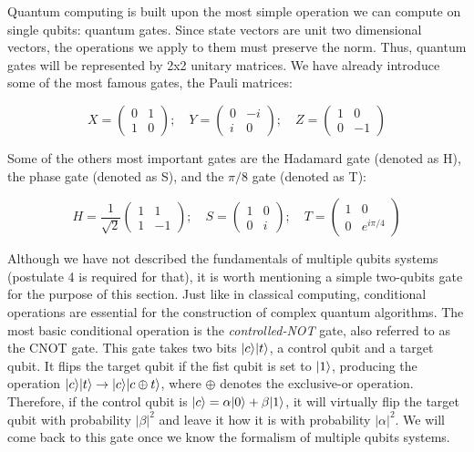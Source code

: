 Quantum computing is built upon the most simple operation we can compute on single qubits: quantum gates. Since state vectors are unit two dimensional vectors, the operations we apply to them must preserve the norm. Thus, quantum gates will be represented by 2x2 unitary matrices. We have already introduce some of the most famous gates, the Pauli matrices:

$$ X =
\begin{pmatrix}
	0 & 1 \\
	1 & 0 
\end{pmatrix}; \quad
Y =
\begin{pmatrix}
	0 & -i \\
	i & 0 
\end{pmatrix}; \quad
Z =
\begin{pmatrix}
	1 & 0 \\
	0 & -1 
\end{pmatrix}
$$

Some of the others most important gates are the Hadamard gate (denoted as H), the phase gate (denoted as S), and the $\pi/8$ gate (denoted as T):

$$ H = \frac{1}{\sqrt 2}
\begin{pmatrix}
	1 & 1 \\
	1 & -1 
\end{pmatrix}; \quad
S =
\begin{pmatrix}
	1 & 0 \\
	0 & i 
\end{pmatrix}; \quad
T =
\begin{pmatrix}
	1 & 0 \\
	0 & e^{i\pi/4} 
\end{pmatrix}
$$

Although we have not described the fundamentals of multiple qubits systems (postulate 4 is required for that), it is worth mentioning a simple two-qubits gate for the purpose of this section. Just like in classical computing, conditional operations are essential for the construction of complex quantum algorithms. The most basic conditional operation is the \emph{controlled-NOT} gate, also referred to as the CNOT gate. This gate takes two bits $|c\rangle|t\rangle$, a control qubit and a target qubit. It flips the target qubit if the fist qubit is set to $|1\rangle$, producing the operation $|c\rangle|t\rangle \rightarrow |c\rangle|c \oplus t\rangle$, where $\oplus$ denotes the exclusive-or operation. Therefore, if the control qubit is $|c\rangle = \alpha|0\rangle + \beta|1\rangle$, it will virtually flip the target qubit with probability $|\beta|^2$ and leave it how it is with probability $|\alpha|^2$. We will come back to this gate once we know the formalism of multiple qubits systems.

